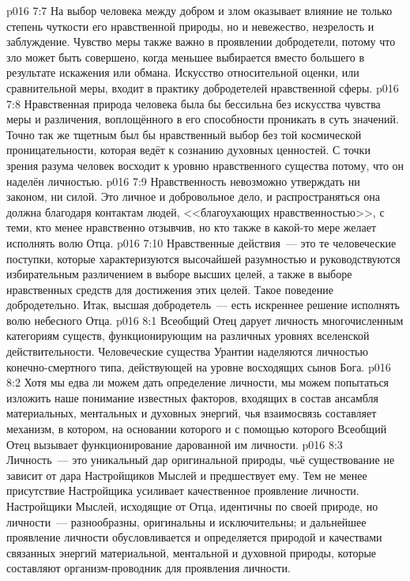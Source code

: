 \vs p016 7:7 На выбор человека между добром и злом оказывает влияние не только степень чуткости его нравственной природы, но и невежество, незрелость и заблуждение. Чувство меры также важно в проявлении добродетели, потому что зло может быть совершено, когда меньшее выбирается вместо большего в результате искажения или обмана. Искусство относительной оценки, или сравнительной меры, входит в практику добродетелей нравственной сферы.
\vs p016 7:8 \pc Нравственная природа человека была бы бессильна без искусства чувства меры и различения, воплощённого в его способности проникать в суть значений. Точно так же тщетным был бы нравственный выбор без той космической проницательности, которая ведёт к сознанию духовных ценностей. С точки зрения разума человек восходит к уровню нравственного существа потому, что он наделён личностью.
\vs p016 7:9 \pc Нравственность невозможно утверждать ни законом, ни силой. Это личное и добровольное дело, и распространяться она должна благодаря контактам людей, <<благоухающих нравственностью>>, с теми, кто менее нравственно отзывчив, но кто также в какой\hyp{}то мере желает исполнять волю Отца.
\vs p016 7:10 Нравственные действия~--- это те человеческие поступки, которые характеризуются высочайшей разумностью и руководствуются избирательным различением в выборе высших целей, а также в выборе нравственных средств для достижения этих целей. Такое поведение добродетельно. Итак, высшая добродетель~--- есть искреннее решение исполнять волю небесного Отца.
\vs p016 8:1 Всеобщий Отец дарует личность многочисленным категориям существ, функционирующим на различных уровнях вселенской действительности. Человеческие существа Урантии наделяются личностью конечно\hyp{}смертного типа, действующей на уровне восходящих сынов Бога.
\vs p016 8:2 Хотя мы едва ли можем дать определение личности, мы можем попытаться изложить наше понимание известных факторов, входящих в состав ансамбля материальных, ментальных и духовных энергий, чья взаимосвязь составляет механизм, в котором, на основании которого и с помощью которого Всеобщий Отец вызывает функционирование дарованной им личности.
\vs p016 8:3 Личность~--- это уникальный дар оригинальной природы, чьё существование не зависит от дара Настройщиков Мыслей и предшествует ему. Тем не менее присутствие Настройщика усиливает качественное проявление личности. Настройщики Мыслей, исходящие от Отца, идентичны по своей природе, но личности~--- разнообразны, оригинальны и исключительны; и дальнейшее проявление личности обусловливается и определяется природой и качествами связанных энергий материальной, ментальной и духовной природы, которые составляют организм\hyp{}проводник для проявления личности.
